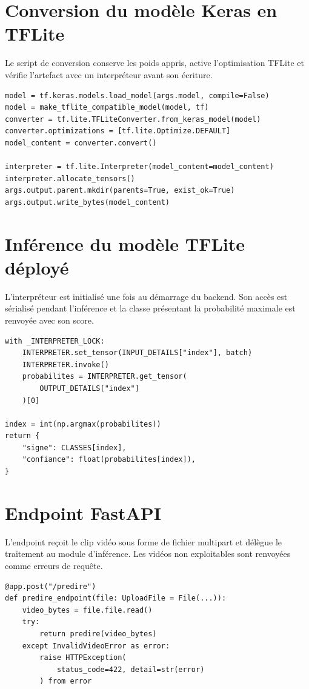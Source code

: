 \section{Conversion du modèle Keras en TFLite}

Le script de conversion conserve les poids appris, active l'optimisation
TFLite et vérifie l'artefact avec un interpréteur avant son écriture.

\begin{verbatim}
model = tf.keras.models.load_model(args.model, compile=False)
model = make_tflite_compatible_model(model, tf)
converter = tf.lite.TFLiteConverter.from_keras_model(model)
converter.optimizations = [tf.lite.Optimize.DEFAULT]
model_content = converter.convert()

interpreter = tf.lite.Interpreter(model_content=model_content)
interpreter.allocate_tensors()
args.output.parent.mkdir(parents=True, exist_ok=True)
args.output.write_bytes(model_content)
\end{verbatim}

\section{Inférence du modèle TFLite déployé}

L'interpréteur est initialisé une fois au démarrage du backend. Son accès est
sérialisé pendant l'inférence et la classe présentant la probabilité maximale
est renvoyée avec son score.

\begin{verbatim}
with _INTERPRETER_LOCK:
    INTERPRETER.set_tensor(INPUT_DETAILS["index"], batch)
    INTERPRETER.invoke()
    probabilites = INTERPRETER.get_tensor(
        OUTPUT_DETAILS["index"]
    )[0]

index = int(np.argmax(probabilites))
return {
    "signe": CLASSES[index],
    "confiance": float(probabilites[index]),
}
\end{verbatim}

\section{Endpoint FastAPI}

L'endpoint reçoit le clip vidéo sous forme de fichier multipart et délègue le
traitement au module d'inférence. Les vidéos non exploitables sont renvoyées
comme erreurs de requête.

\begin{verbatim}
@app.post("/predire")
def predire_endpoint(file: UploadFile = File(...)):
    video_bytes = file.file.read()
    try:
        return predire(video_bytes)
    except InvalidVideoError as error:
        raise HTTPException(
            status_code=422, detail=str(error)
        ) from error
\end{verbatim}

